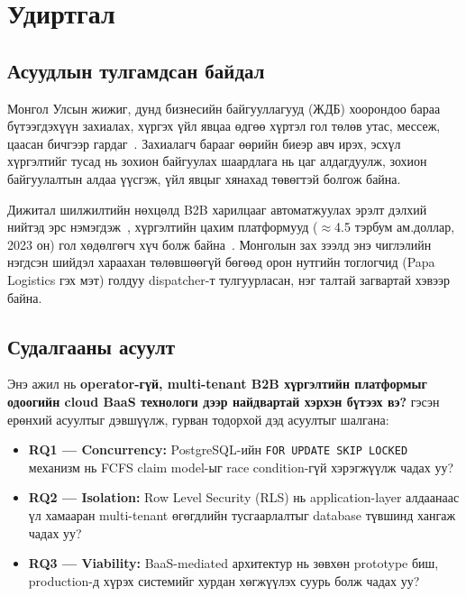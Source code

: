 
\section{Удиртгал}
\label{sec:introduction}

\subsection{Асуудлын тулгамдсан байдал}

Монгол Улсын жижиг, дунд бизнесийн байгууллагууд (ЖДБ) хоорондоо бараа бүтээгдэхүүн захиалах, хүргэх үйл явцаа өдгөө хүртэл гол төлөв утас, мессеж, цаасан бичгээр гардаг~\cite{nso2023}. Захиалагч барааг өөрийн биеэр авч ирэх, эсхүл хүргэлтийг тусад нь зохион байгуулах шаардлага нь цаг алдагдуулж, зохион байгуулалтын алдаа үүсгэж, үйл явцыг хянахад төвөгтэй болгож байна.

Дижитал шилжилтийн нөхцөлд B2B харилцааг автоматжуулах эрэлт дэлхий нийтэд эрс нэмэгдэж~\cite{mckinsey2021delivery, grandview2023}, хүргэлтийн цахим платформууд ($\approx$4.5 тэрбум ам.доллар, 2023 он) гол хөдөлгөгч хүч болж байна~\cite{wang2016bigdata}. Монголын зах зээлд энэ чиглэлийн нэгдсэн шийдэл хараахан төлөвшөөгүй бөгөөд орон нутгийн тоглогчид (Papa Logistics гэх мэт) голдуу dispatcher-т тулгуурласан, нэг талтай загвартай хэвээр байна.

\subsection{Судалгааны асуулт}

Энэ ажил нь \textbf{operator-гүй, multi-tenant B2B хүргэлтийн платформыг одоогийн cloud BaaS технологи дээр найдвартай хэрхэн бүтээх вэ?} гэсэн ерөнхий асуултыг дэвшүүлж, гурван тодорхой дэд асуултыг шалгана:

\begin{itemize}
    \item \textbf{RQ1 — Concurrency:} PostgreSQL-ийн \texttt{FOR UPDATE SKIP LOCKED} механизм нь FCFS claim model-ыг race condition-гүй хэрэгжүүлж чадах уу?
    \item \textbf{RQ2 — Isolation:} Row Level Security (RLS) нь application-layer алдаанаас үл хамааран multi-tenant өгөгдлийн тусгаарлалтыг database түвшинд хангаж чадах уу?
    \item \textbf{RQ3 — Viability:} BaaS-mediated архитектур нь зөвхөн prototype биш, production-д хүрэх системийг хурдан хөгжүүлэх суурь болж чадах уу?
\end{itemize}

